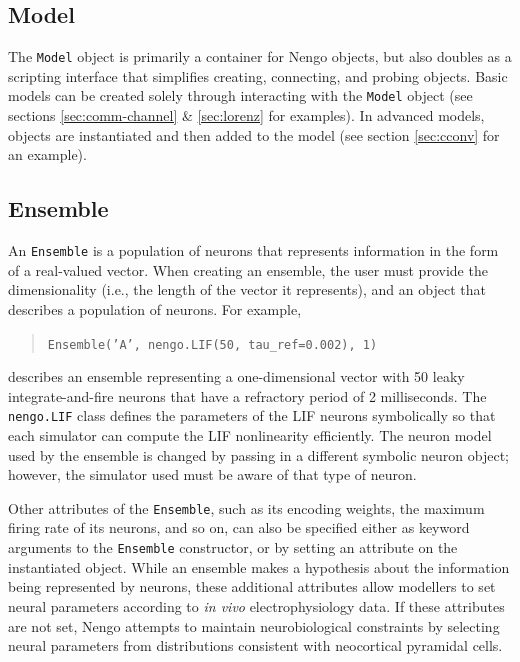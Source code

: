 \documentclass{frontiersSCNS}
\begin{document}
\subsection{Model}

The \texttt{Model} object is primarily a container
for Nengo objects,
but also doubles as a scripting interface
that simplifies creating, connecting,
and probing objects.
Basic models
can be created solely through interacting
with the \texttt{Model} object
(see sections \ref{sec:comm-channel} \& \ref{sec:lorenz}
for examples).
In advanced models,
objects are instantiated
and then added to the model
(see section \ref{sec:cconv} for an example).

\subsection{Ensemble}

An \texttt{Ensemble} is
a population of neurons
that represents information
in the form of a real-valued vector.
When creating an ensemble,
the user must provide the dimensionality
(i.e., the length of the vector it represents),
and an object that describes
a population of neurons.
For example,
\begin{quote}
  \texttt{Ensemble('A', nengo.LIF(50, tau\_ref=0.002), 1)}
\end{quote}
describes an ensemble representing a one-dimensional vector
with 50 leaky integrate-and-fire neurons \citep{lapicque1907}
that have a refractory period of 2 milliseconds.
The \texttt{nengo.LIF} class defines
the parameters of the LIF neurons symbolically
so that each simulator can compute
the LIF nonlinearity efficiently.
The neuron model used by the ensemble
is changed by passing in a different symbolic neuron object;
however, the simulator used must be aware
of that type of neuron.

Other attributes of the \texttt{Ensemble},
such as its encoding weights,
the maximum firing rate of its neurons,
and so on, can also be specified
either as keyword arguments
to the \texttt{Ensemble} constructor,
or by setting an attribute on the instantiated object.
While an ensemble makes a hypothesis
about the information being represented by neurons,
these additional attributes
allow modellers to set
neural parameters according to \textit{in vivo}
electrophysiology data.
If these attributes are not set,
Nengo attempts to maintain
neurobiological constraints
by selecting neural parameters
from distributions consistent with
neocortical pyramidal cells.
\end{document}

